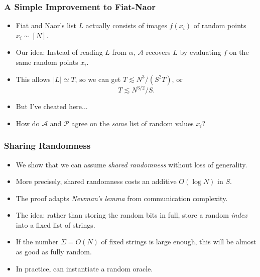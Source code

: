 \documentclass[usenames, dvipsnames, t, table]{beamer}
\newcommand{\inlineauthor}[1]{\raisebox{-0.5 \height}{\texttt{[image: assets/\#1]}}}
\newcommand{\A}{\mathcal{A}}
\renewcommand{\P}{\mathcal{P}}
\begin{document}
  \begin{frame}
    \frametitle{A Simple Improvement to Fiat-Naor}
    \begin{itemize}
    \item  Fiat and Naor's list $L$ actually consists of images $f(x_i)$ of random points $x_i \sim [N]$.
      \pause
    \item Our idea: Instead of reading $L$ from $\alpha$,
      $\A$ recovers $L$ by evaluating $f$ on the same random  points $x_i$.
      \pause
    \item This allows $|L| \simeq T$, so we can get $T \lesssim N^3 / (S^2 T)$, or
      \[
        T \lesssim N^{3/2} / S.
      \]
      \mypause
    \item But I've cheated here...
      \pause
    \item How do $\A$ and $\P$ agree on the \emph{same} list of random values $x_i$?
      \end{itemize}
  \end{frame}

  \begin{frame}
    \frametitle{Sharing Randomness}
    \begin{itemize}
    \item We show that we can assume \emph{shared randomness}  without loss of generality.
      \pause
    \item More precisely, shared randomness costs an additive $O(\log N)$ in $S$.
      \pause
    \item The proof adapts \emph{Newman's lemma} \cite{Newman91} \inlineauthor{newman} from communication complexity.
      \pause
    \item The idea: rather than storing the random bits in full, store a random \emph{index} into a fixed list of strings.
      \pause
    \item If the number $\Sigma = O(N)$ of fixed strings is large enough, this will be almost as good as fully random.
      \pause
    \item In practice, can instantiate a random oracle.
    \end{itemize}
  \end{frame}
\end{document}
